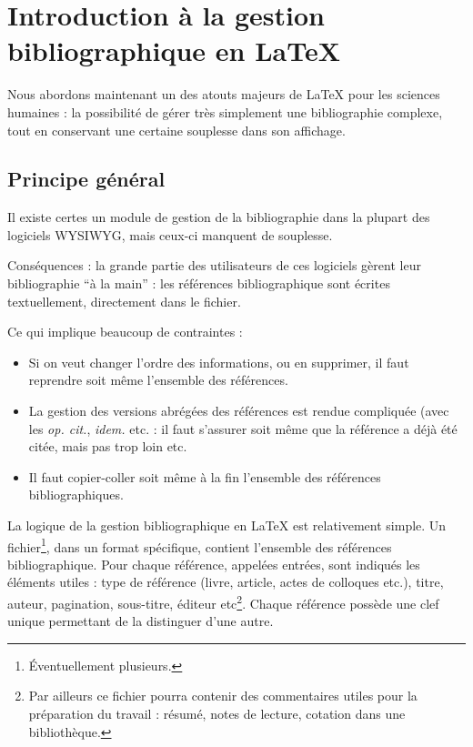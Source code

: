\chapter[Introduction]{Introduction à la gestion bibliographique en \LaTeX{}}
\begin{prealable}
Nous abordons maintenant un des atouts majeurs de \LaTeX{} pour les sciences humaines : la possibilité de gérer très simplement une bibliographie complexe, tout en conservant une certaine souplesse dans son affichage.

\end{prealable}
\section{Principe général}



Il existe certes un module de gestion de la bibliographie dans la plupart des logiciels WYSIWYG, mais ceux-ci manquent de souplesse.

Conséquences : la grande partie des utilisateurs de ces logiciels gèrent leur bibliographie \enquote{à la main} : les références bibliographique sont écrites textuellement, directement dans le fichier. 

Ce qui implique beaucoup de contraintes  :
\begin{itemize}
\item Si on veut changer l'ordre des informations, ou en supprimer, il faut reprendre soit même l'ensemble des références.
\item La gestion des versions abrégées des références est rendue compliquée (avec les \emph{op. cit.}, \emph{idem.} etc. :  il faut s'assurer soit même que la référence a déjà été citée, mais pas trop loin etc. 
\item Il faut copier-coller soit même à la fin l'ensemble des références bibliographiques. 
\end{itemize}

La logique de la gestion bibliographique en \LaTeX{} est relativement simple. Un fichier\footnote{Éventuellement plusieurs.}, dans un format spécifique, contient l'ensemble des références bibliographique. Pour chaque référence, appelées entrées, sont indiqués les éléments utiles :  type de référence (livre, article, actes de colloques etc.), titre, auteur, pagination, sous-titre, éditeur etc\footnote{Par ailleurs ce fichier pourra contenir des commentaires utiles pour la préparation du travail : résumé, notes de lecture, cotation dans une bibliothèque.}. Chaque référence possède une clef unique permettant de la distinguer d'une autre.

